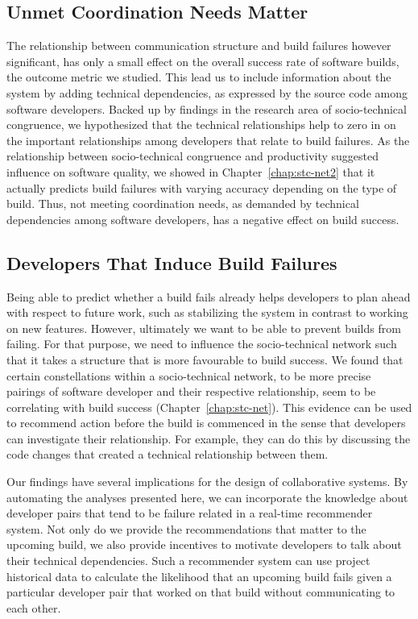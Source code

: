 \subsection{Unmet Coordination Needs Matter}
The relationship between communication structure and build failures however significant, has only a small effect on the overall success rate of software builds, the outcome metric we studied.
This lead us to include information about the system by adding technical dependencies, as expressed by the source code among software developers.
Backed up by findings in the research area of socio-technical congruence, we hypothesized that the technical relationships help to zero in on the important relationships among developers that relate to build failures.
As the relationship between socio-technical congruence and productivity suggested influence on software quality, we showed in Chapter~\ref{chap:stc-net2} that it actually predicts build failures with varying accuracy depending on the type of build.
Thus, not meeting coordination needs, as demanded by technical dependencies among software developers, has a negative effect on build success.

\subsection{Developers That Induce Build Failures}
\label{sec:implications}
Being able to predict whether a build fails already helps developers to plan ahead with respect to future work, such as stabilizing the system in contrast to working on new features.
However, ultimately we want to be able to prevent builds from failing.
For that purpose, we need to influence the socio-technical network such that it takes a structure that is more favourable to build success.
We found that certain constellations within a socio-technical network, to be more precise pairings of software developer and their respective relationship, seem to be correlating with build success (Chapter~\ref{chap:stc-net}).
This evidence can be used to recommend action before the build is commenced in the sense that developers can investigate their relationship.
For example, they can do this by discussing the code changes that created a technical relationship between them.

Our findings have several implications for the design of collaborative systems.
By automating the analyses presented here, we can incorporate the knowledge about
developer pairs that tend to be failure related in a real-time recommender
system. Not only do we provide the recommendations that matter to the upcoming
build, we also provide incentives to motivate developers to talk about their
technical dependencies. 
Such a recommender system can use project historical data to
calculate the likelihood that an upcoming build fails given a particular
developer pair that worked on that build without communicating to each other.


